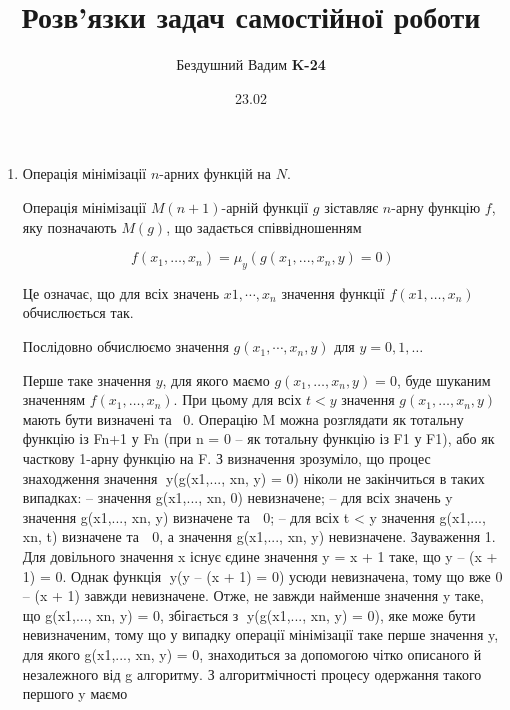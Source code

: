 \documentclass[a4paper, 12pt]{article}
\title{Розв’язки задач самостійної роботи}
\author{Бездушний Вадим \textbf{K-24}}
\date{23.02}
\begin{document}
\maketitle
\begin{enumerate}
\item{Операція мінімізації $n$-арних функцій на $N$. \par
\begin{test-answer}
Операція мінімізації $M(n + 1)$-арній функції $g$ зіставляє $n$-арну функцію $f$, яку позначають $M(g)$, що задається співвідношенням

\[f(x_1, \dots, x_n) = \mu_y(g(x_1,...,x_n, y) = 0)\]

Це означає, що для всіх значень $x1, \cdots, x_n$ значення функції $f(x1, \dots, x_n)$ обчислюється так. 

Послідовно обчислюємо значення $g(x_1, \cdots, x_n, y)$ для $y = 0, 1, \dots$

 Перше таке значення $y$, для якого маємо $g(x_1, \dots, x_n, y) = 0$, буде шуканим значенням $f(x_1,\dots, x_n)$. При цьому для всіх $t < y$ значення $g(x_1,\dots, x_n, y)$ мають бути визначені та \ 0.
Операцію M можна розглядати як тотальну функцію із Fn+1 у Fn (при n = 0 – як тотальну функцію із F1 у F1), або як часткову 1-арну функцію на F. 
З визначення зрозуміло, що процес знаходження значення y(g(x1,..., xn, y) = 0) ніколи не закінчиться в таких випадках: 
– значення g(x1,..., xn, 0) невизначене;
– для всіх значень y значення g(x1,..., xn, y) визначене та  0; 
– для всіх t < y значення g(x1,..., xn, t) визначене та  0, а значення g(x1,..., xn, y) невизначене.
Зауваження 1. Для довільного значення x існує єдине значення y = x + 1 таке, що y – (x + 1) = 0. Однак функція y(y – (x + 1) = 0) усюди невизначена, тому що вже 0 – (x + 1) завжди невизначене. Отже, не завжди найменше значення y таке, що g(x1,..., xn, y) = 0, збігається з y(g(x1,..., xn, y) = 0), яке може бути невизначеним, тому що у випадку операції мінімізації таке перше значення y, для якого g(x1,..., xn, y) = 0, знаходиться за допомогою чітко описаного й незалежного від g алгоритму.
З алгоритмічності процесу одержання такого першого y маємо


\end{test-answer}}
\end{enumerate}
\end{document}
